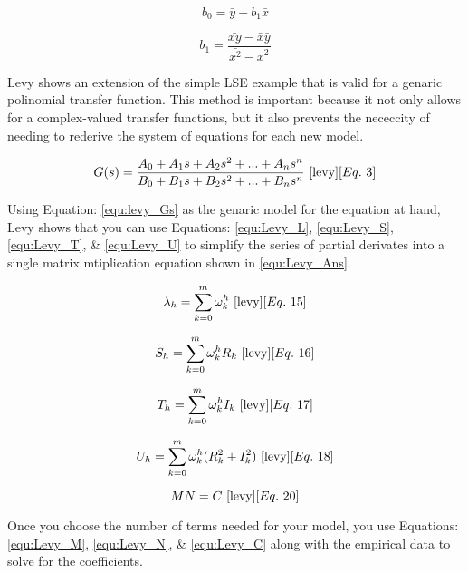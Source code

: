 \begin{equation}
\label{equ:LSE_solc}
b_0 = \bar{y} - b_1 \bar{x}
\end{equation}

\begin{equation}
\label{equ:LSE_sold}
b_1 = \frac{\bar{xy} - \bar{x}\bar{y}}{\bar{x^2} - \bar{x}^2}
\end{equation}

Levy \cite{levy} shows an extension of the simple LSE example that is valid for a genaric polinomial transfer function. This method is important because it not only allows for a complex-valued transfer functions, but it also prevents the nececcity of needing to rederive the system of equations for each new model. 

\begin{equation}
\label{equ:levy_Gs}
G(s) = \frac{A_0 + A_1 s + A_2 s^2 + ... + A_n s^n}{B_0 + B_1 s + B_2 s^2 + ... + B_n s^n}
~\cite{levy}[Eq.~3]
\end{equation}

Using Equation: \eqref{equ:levy_Gs} as the genaric model for the equation at hand, Levy shows that you can use Equations: \eqref{equ:Levy_L}, \eqref{equ:Levy_S}, \eqref{equ:Levy_T}, \& \eqref{equ:Levy_U} to simplify the series of partial derivates into a single matrix mtiplication equation shown in \eqref{equ:Levy_Ans}.

\begin{equation}
\label{equ:Levy_L}
\lambda _h = \sum_{k=0}^{m} \omega _k ^h
~\cite{levy}[Eq.~15]
\end{equation}

\begin{equation}
\label{equ:Levy_S}
S_h = \sum_{k=0}^{m} \omega _k ^h R_k
~\cite{levy}[Eq.~16]
\end{equation}

\begin{equation}
\label{equ:Levy_T}
T_h = \sum_{k=0}^{m} \omega _k ^h I_k
~\cite{levy}[Eq.~17]
\end{equation}

\begin{equation}
\label{equ:Levy_U}
U_h = \sum_{k=0}^{m} \omega _k ^h (R_k ^2 + I_k ^2)
~\cite{levy}[Eq.~18]
\end{equation}

\begin{equation}
\label{equ:Levy_Ans}
MN = C
~\cite{levy}[Eq.~20]
\end{equation}

Once you choose the number of terms needed for your model, you use Equations: \eqref{equ:Levy_M}, \eqref{equ:Levy_N}, \& \eqref{equ:Levy_C} along with the empirical data to solve for the coefficients.

